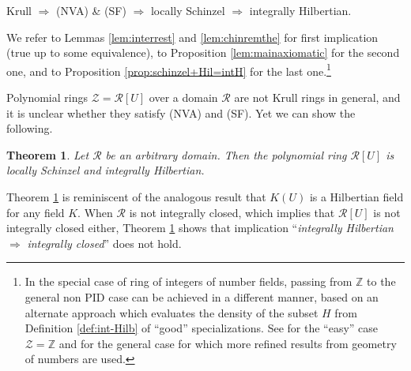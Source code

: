 \documentclass[11pt,a4paper,reqno]{amsart}
\newtheorem{thm}{Theorem}[section]
\theoremstyle{definition}
\begin{document}
{\centerline{Krull $\Rightarrow$  (NVA) \& (SF) $\Rightarrow$  locally Schinzel $\Rightarrow$  integrally Hilbertian.}

\vskip 1mm
\noindent
We refer to Lemmas \ref{lem:interrest} and \ref{lem:chinremthe} for first implication (true up to some equivalence), to Proposition \ref{lem:mainaxiomatic} for the second one, and to Proposition \ref{prop:schinzel+Hil=intH} for the last one.\footnote{
In the special case of ring of integers of number fields, passing from ${\mathbb Z}$ to the general non PID case can be achieved in a different manner, based on an alternate approach which eva\-luates the density of the subset $H$ from Definition \ref{def:int-Hilb} of ``good'' specializations. See \cite{BD22} for the ``easy'' case ${\mathcal Z}={\mathbb Z}$ and \cite{BD26} for the general case for which more refined results from geometry of numbers are used.
} 


\vskip 1mm

Polynomial rings $\mathcal{Z}={\mathcal R}[U]$ over a domain $\mathcal{R}$ are not Krull rings in general, and it is unclear whether they satisfy (NVA) and (SF). 
Yet we can show the following. 

\begin{thm} \label{thm:main1-2}
Let ${\mathcal R}$ be an arbitrary domain. Then the polynomial ring ${\mathcal R}[U]$ is locally Schinzel and integrally Hilbertian.
\end{thm}

Theorem \ref{thm:main1-2} is reminiscent of the analogous result that $K(U)$ is a Hilbertian field for any field $K$. When ${\mathcal R}$ is not integrally closed, which implies that ${\mathcal R}[U]$ is not integrally closed either, Theorem \ref{thm:main1-2} shows that implication ``\emph{integrally Hilbertian} $\Rightarrow$ \emph{integrally closed}'' does not hold.






}
\end{document}
